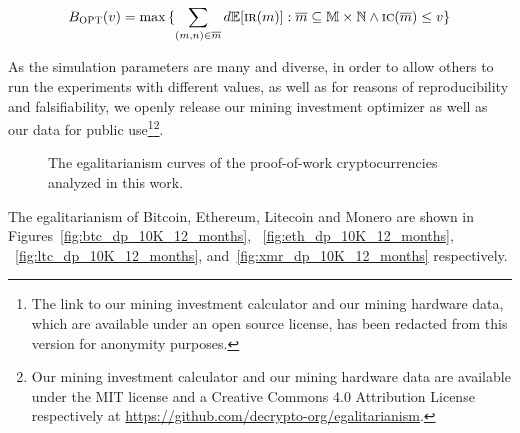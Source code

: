\[
  B_\textsc{OPT}(v)
  =
  \max{
    \{
      \sum_{(m, n) \in \overline{m}}
      {d\mathbb{E}[\textsc{ir}(m)]}:
      \overline{m} \subseteq \mathbb{M} \times \mathbb{N}
      \land
      \textsc{ic}(\overline{m}) \leq v
    \}
  }
\]

As the simulation parameters are many and diverse, in order to allow others to
run the experiments with different values, as well as for reasons of
reproducibility and falsifiability, we openly release our mining investment
optimizer as well as our data for public use\ifanonymous\footnote{The link to our mining investment calculator and our mining hardware data,
  which are available under an open source license, has been redacted from this
  version for anonymity purposes.
}\else\footnote{Our mining investment calculator and our mining hardware data are available
  under the MIT license and a Creative Commons 4.0 Attribution License
  respectively at \url{https://github.com/decrypto-org/egalitarianism}.
}\fi.

\begin{figure}
  \caption{The egalitarianism curves of the proof-of-work cryptocurrencies analyzed in this work.}
  \label{fig:egalitarian_curves_pow}
\end{figure}

The egalitarianism of Bitcoin, Ethereum, Litecoin and Monero are shown in
Figures~\ref{fig:btc_dp_10K_12_months}, ~\ref{fig:eth_dp_10K_12_months},
~\ref{fig:ltc_dp_10K_12_months}, and~\ref{fig:xmr_dp_10K_12_months}
respectively.

